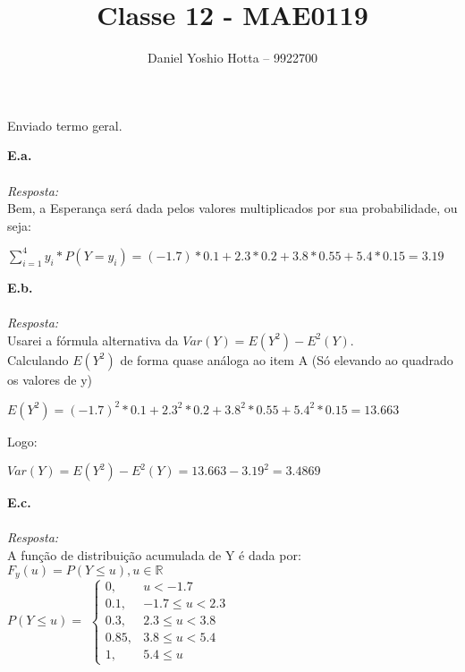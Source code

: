 \documentclass{article}
\begin{document}
	
	\title{Classe 12 - MAE0119}
	\author{Daniel Yoshio Hotta – 9922700}
	
	\maketitle	
	
		Enviado termo geral.
	
	\textbf {E.a.} 
	\\ \\
	\textit {Resposta:} \\
    
    Bem, a Esperança será dada pelos valores multiplicados por sua probabilidade, ou seja:
    
    \begin{center}
    	$\sum_{i = 1}^{4} y_i * P(Y = y_i) = (-1.7) * 0.1 + 2.3 * 0.2 + 3.8 * 0.55 + 5.4 * 0.15 = 3.19$\\
    \end{center}
    
    \textbf {E.b.} 
    \\ \\
    \textit {Resposta:} \\
    
    Usarei a fórmula alternativa da $Var(Y) = E(Y^2) - E^2(Y)$.\\
    
    Calculando $E(Y^2)$ de forma quase análoga ao item A (Só elevando ao quadrado os valores de y)
    
    \begin{center}
    	$E(Y^2) = (-1.7)^2 * 0.1 + 2.3^2 * 0.2 + 3.8^2 * 0.55 + 5.4^2 * 0.15 = 13.663$
    \end{center}

    Logo:
    
    \begin{center}
    	$Var(Y) = E(Y^2) - E^2(Y) = 13.663 - 3.19^2 = 3.4869$
    \end{center}
    
    \textbf {E.c.} 
    \\ \\
    \textit {Resposta:} \\
    
    A função de distribuição acumulada de Y é dada por: \\
    
    $F_y(u) = P(Y \leq u), u\in \mathbb{R}$\\
    
    $P(Y \leq u) = $
    $
    \begin{cases}
        0,   &u < -1.7\\
        0.1, & -1.7 \leq u < 2.3\\
        0.3, &  2.3 \leq u < 3.8\\
        0.85,&  3.8 \leq u < 5.4\\
        1,   &  5.4 \leq u
    \end{cases}
	$
	
\end{document}
